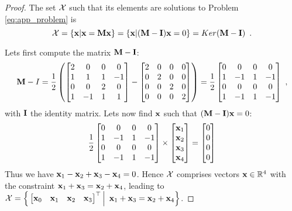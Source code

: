 \begin{proof}
	The set $\mathcal{X}$ such that its elements are solutions to Problem \ref{eq:app_problem} is
	$$
	\setX = \{\vx | \vx = \mm\vx\} = \{\vx | (\mm - \mi)\vx = 0\}  = Ker(\mm - \mi)\enspace.
	$$
	
	Lets first compute the matrix $\mm-\mi$:
	\begin{equation*}
		\begin{split}
			\mm - I = \frac{1}{2} \left( 
			\begin{bmatrix}
				2 & 0 & 0 & 0 \\
				1 & 1 & 1 & -1 \\
				0 & 0 & 2 & 0 \\
				1 & -1 & 1 & 1
			\end{bmatrix} -
			\begin{bmatrix}
				2 & 0 & 0 & 0 \\
				0 & 2 & 0 & 0 \\
				0 & 0 & 2 & 0 \\
				0 & 0 & 0 & 2
			\end{bmatrix}
			\right)
			= \frac{1}{2}\begin{bmatrix}
				0 & 0 & 0 & 0 \\
				1 & -1 & 1 & -1 \\
				0 & 0 & 0 & 0 \\
				1 & -1 & 1 & -1
			\end{bmatrix}
		\end{split} \enspace,
	\end{equation*}
	with $\mi$ the identity matrix. Lets now find $\textbf{x}$ such that $(\mm - \mi)\vx = 0$:
	$$
	\frac{1}{2}\begin{bmatrix}
		0 & 0 & 0 & 0 \\
		1 & -1 & 1 & -1 \\
		0 & 0 & 0 & 0 \\
		1 & -1 & 1 & -1
	\end{bmatrix} 
	\times
	\begin{bmatrix}
		\textbf{x}_1 \\
		\textbf{x}_2 \\
		\textbf{x}_3 \\
		\textbf{x}_4
	\end{bmatrix} = 
	\begin{bmatrix}
		0 \\
		0 \\
		0 \\
		0
	\end{bmatrix}
	$$
	Thus we have $\textbf{x}_1 - \textbf{x}_2 + \textbf{x}_3 - \textbf{x}_4 = 0$. Hence $\mathcal{X}$ comprises vectors $\textbf{x}\in\mathbb{R}^4$ with the constraint $\textbf{x}_1 + \textbf{x}_3 = \textbf{x}_2 + \textbf{x}_4$, leading to $\mathcal{X} = \Big\{\begin{bmatrix}	\textbf{x}_0 & \textbf{x}_1 & \textbf{x}_2 & \textbf{x}_3 \end{bmatrix}^\top \Big|\enspace \textbf{x}_1 + \textbf{x}_3 = \textbf{x}_2 + \textbf{x}_4\Big\}$.
\end{proof}
